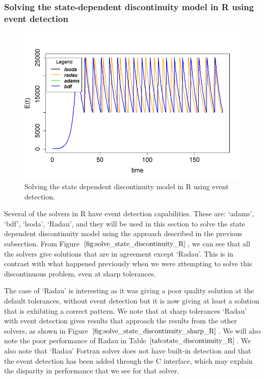 \subsubsection{Solving the state-dependent discontinuity model in R using event detection}
\begin{figure}[H]
\centering
\includegraphics[width=0.7\linewidth]{./figures/solve_state_discontinuity_R}
\caption{Solving the state dependent discontinuity model in R using event detection.}
\label{fig:solve_state_discontinuity_R}
\end{figure}
Several of the solvers in R have event detection capabilities. These are: `adams', `bdf', `lsoda', `Radau', and they will be used in this section to solve the state dependent discontinuity model using the approach described in the previous subsection. From Figure $\ref{fig:solve_state_discontinuity_R}$, we can see that all the solvers give solutions that are in agreement except `Radau'. This is in contrast with what happened previously when we were zttempting to solve this discontinuous problem, even at sharp tolerances. 

The case of `Radau' is interesting as it was giving a poor quality solution at the default tolerances, without event detection but it is now giving at least a solution that is exhibiting a correct pattern. We note that at sharp tolerances `Radau' with event detection gives results that approach the results from the other solvers, as shown in Figure $\ref{fig:solve_state_discontinuity_sharp_R}$. We will also note the poor performance of Radau in Table $\ref{tab:state_discontinuity_R}$. We also note that `Radau' Fortran solver does not have built-in detection and that the event detection has been added through the C interface, which may explain the disparity in performance that we see for that solver.

